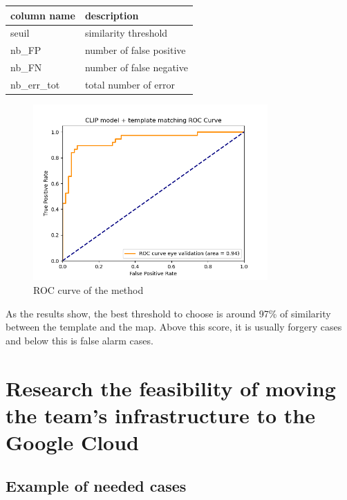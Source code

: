 \begin{table}[H]
\centering
{} \label{tab:description_threshold} 
\begin{tabular}{|l|l|}
\hline
\textbf{column name}  & \textbf{description}              \\ \hline
seuil        & similarity threshold     \\ \hline
nb\_FP       & number of false positive \\ \hline
nb\_FN       & number of false negative \\ \hline
nb\_err\_tot & total number of error    \\ \hline
\end{tabular}
\end{table}

\begin{figure}[H]
    \centering
    \includegraphics[width=0.8\textwidth]{images/cas_1_roc-curve.png}
    \caption{ROC curve of the method}
    \label{fig:clip_roc-curve}
\end{figure}

As the results show, the best threshold to choose is around 97\% of similarity between the template and the map. Above this score, it is usually forgery cases and below this is false alarm cases.

\section{Research the feasibility of moving the team's infrastructure to the Google Cloud}

\subsection{Example of needed cases}

